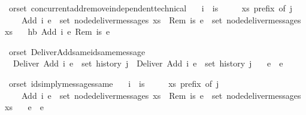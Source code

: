 \begin{isabellebody}
\isamarkupfalse%
\ {\isacharparenleft}\ orset{\isacharparenright}\ concurrent{\isacharunderscore}add{\isacharunderscore}remove{\isacharunderscore}independent{\isacharunderscore}technical{\isacharcolon}\isanewline
\ \ \ {\isachardoublequoteopen}i\ {\isasymin}\ is{\isachardoublequoteclose}\isanewline
\ \ \ \ \ {\isachardoublequoteopen}xs\ prefix\ of\ j{\isachardoublequoteclose}\isanewline
\ \ \ \ \ {\isachardoublequoteopen}Add\ i\ e\ {\isasymin}\ set\ {\isacharparenleft}node{\isacharunderscore}deliver{\isacharunderscore}messages\ xs{\isacharparenright}{\isachardoublequoteclose}\ \ {\isachardoublequoteopen}Rem\ is\ e\ {\isasymin}\ set\ {\isacharparenleft}node{\isacharunderscore}deliver{\isacharunderscore}messages\ xs{\isacharparenright}{\isachardoublequoteclose}\isanewline
\ \ \ {\isachardoublequoteopen}hb\ {\isacharparenleft}Add\ i\ e{\isacharparenright}\ {\isacharparenleft}Rem\ is\ e{\isacharparenright}{\isachardoublequoteclose}\isanewline
\end{isabellebody}

\begin{isabellebody}
\isamarkupfalse%
\ {\isacharparenleft}\ orset{\isacharparenright}\ Deliver{\isacharunderscore}Add{\isacharunderscore}same{\isacharunderscore}id{\isacharunderscore}same{\isacharunderscore}message{\isacharcolon}\isanewline
\ \ \ {\isachardoublequoteopen}Deliver\ {\isacharparenleft}Add\ i\ e{}{\isacharparenright}\ {\isasymin}\ set\ {\isacharparenleft}history\ j{\isacharparenright}{\isachardoublequoteclose}\ \ {\isachardoublequoteopen}Deliver\ {\isacharparenleft}Add\ i\ e{}{\isacharparenright}\ {\isasymin}\ set\ {\isacharparenleft}history\ j{\isacharparenright}{\isachardoublequoteclose}\isanewline
\ \ \ {\isachardoublequoteopen}e{}\ {\isacharequal}\ e{}{\isachardoublequoteclose}\isanewline
\end{isabellebody}

\begin{isabellebody}
\isamarkupfalse%
\ {\isacharparenleft}\ orset{\isacharparenright}\ ids{\isacharunderscore}imply{\isacharunderscore}messages{\isacharunderscore}same{\isacharcolon}\isanewline
\ \ \ {\isachardoublequoteopen}i\ {\isasymin}\ is{\isachardoublequoteclose}\isanewline
\ \ \ \ \ {\isachardoublequoteopen}xs\ prefix\ of\ j{\isachardoublequoteclose}\isanewline
\ \ \ \ \ {\isachardoublequoteopen}Add\ i\ e{}\ {\isasymin}\ set\ {\isacharparenleft}node{\isacharunderscore}deliver{\isacharunderscore}messages\ xs{\isacharparenright}{\isachardoublequoteclose}\ \ {\isachardoublequoteopen}Rem\ is\ e{}\ {\isasymin}\ set\ {\isacharparenleft}node{\isacharunderscore}deliver{\isacharunderscore}messages\ xs{\isacharparenright}{\isachardoublequoteclose}\isanewline
\ \ \ {\isachardoublequoteopen}e{}\ {\isacharequal}\ e{}{\isachardoublequoteclose}\isanewline
\end{isabellebody}

